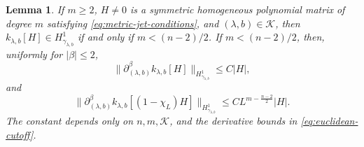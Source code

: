 \documentclass[11pt]{article}
\numberwithin{equation}{section}
\newtheorem{lemma}[theorem]{Lemma}
\theoremstyle{remark}
\newcommand{\norm}[1]{\lVert #1\rVert}
\begin{document}
\begin{lemma}\label{lem:metric-jet-threshold}
If \(m\ge2\), \(H\ne0\) is a symmetric homogeneous polynomial matrix of
degree \(m\) satisfying \eqref{eq:metric-jet-conditions}, and
\((\lambda,b)\in\mathcal K\), then
\(k_{\lambda,b}[H]\in H^1_{\gamma_{\lambda,b}}\) if and only if
\(m<(n-2)/2\).
If \(m<(n-2)/2\), then, uniformly for \(|\beta|\le2\),
\[
 \norm{\partial_{(\lambda,b)}^\beta k_{\lambda,b}[H]}_{H^1_{\gamma_{\lambda,b}}}
 \le C|H|,
\]
and
\begin{equation}\label{eq:metric-jet-tail}
 \norm{\partial_{(\lambda,b)}^\beta
 k_{\lambda,b}[(1-\chi_L)H]}_{H^1_{\gamma_{\lambda,b}}}
 \le CL^{m-\frac{n-2}{2}}|H|.
\end{equation}
The constant depends only on \(n,m,\mathcal K\), and the derivative bounds
in \eqref{eq:euclidean-cutoff}.
\end{lemma}
\end{document}

